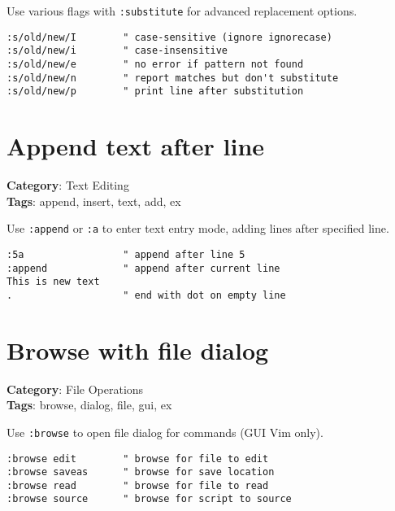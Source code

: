 {{{{Use various flags with {\footnotesize \Verb§:substitute§} for advanced replacement options.

\begin{Exa*}{}
\begin{Verbatim}[fontsize=\footnotesize, breaklines, breakanywhere]
:s/old/new/I        " case-sensitive (ignore ignorecase)
:s/old/new/i        " case-insensitive
:s/old/new/e        " no error if pattern not found
:s/old/new/n        " report matches but don't substitute
:s/old/new/p        " print line after substitution
\end{Verbatim}
\end{Exa*}

\section{Append text after line}

\textbf{Category}: Text Editing\\ \textbf{Tags}: append, insert, text, add, ex
\vspace{0.5cm}

Use {\footnotesize \Verb§:append§} or {\footnotesize \Verb§:a§} to enter text entry mode, adding lines after specified line.

\begin{Exa*}{}
\begin{Verbatim}[fontsize=\footnotesize, breaklines, breakanywhere]
:5a                 " append after line 5
:append             " append after current line
This is new text
.                   " end with dot on empty line
\end{Verbatim}
\end{Exa*}

\section{Browse with file dialog}

\textbf{Category}: File Operations\\ \textbf{Tags}: browse, dialog, file, gui, ex
\vspace{0.5cm}

Use {\footnotesize \Verb§:browse§} to open file dialog for commands (GUI Vim only).

\begin{Exa*}{}
\begin{Verbatim}[fontsize=\footnotesize, breaklines, breakanywhere]
:browse edit        " browse for file to edit
:browse saveas      " browse for save location
:browse read        " browse for file to read
:browse source      " browse for script to source
\end{Verbatim}
\end{Exa*}

}}}}
